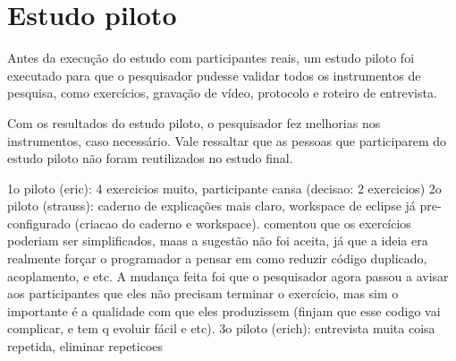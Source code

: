 \section{Estudo piloto}
\label{sec:estudo-piloto}

Antes da execução do estudo com participantes reais, um estudo piloto foi
executado para que o pesquisador pudesse validar todos os instrumentos de pesquisa,
como exercícios, gravação de vídeo, protocolo e roteiro de entrevista.

Com os resultados do estudo piloto, o pesquisador fez melhorias
nos instrumentos, caso necessário.
Vale ressaltar que as pessoas que participarem do estudo piloto não foram reutilizados no
estudo final.

1o piloto (eric): 4 exercicios muito, participante cansa (decisao: 2 exercicios)
2o piloto (strauss): caderno de explicações mais claro, workspace de eclipse já pre-configurado (criacao do caderno e workspace). comentou que os exercícios poderiam ser simplificados, maas a sugestão não foi aceita, já que a ideia era realmente forçar o programador a pensar em como reduzir código duplicado, acoplamento, e etc. A mudança feita foi que o pesquisador agora passou a avisar aos participantes que eles não precisam terminar o exercício, mas sim o importante é a qualidade com que eles produzissem (finjam que esse codigo vai complicar, e tem q evoluir fácil e etc).
3o piloto (erich): entrevista muita coisa repetida, eliminar repeticoes

